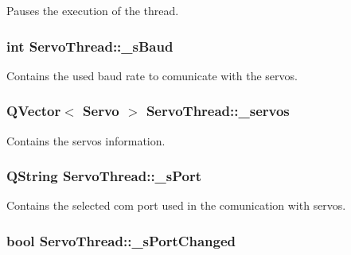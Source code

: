 Pauses the execution of the thread. 

\hypertarget{class_servo_thread_a5b9a41b9e271275b914affb0a845a2ee}{}
\subsubsection[{\+\_\+s\+Baud}]{\setlength{\rightskip}{0pt plus 5cm}int Servo\+Thread\+::\+\_\+s\+Baud\hspace{0.3cm}{\ttfamily [private]}}\label{class_servo_thread_a5b9a41b9e271275b914affb0a845a2ee}


Contains the used baud rate to comunicate with the servos. 

\hypertarget{class_servo_thread_a1ac6662fe6d198b5971ae0ffa7ddfcfd}{}
\subsubsection[{\+\_\+servos}]{\setlength{\rightskip}{0pt plus 5cm}Q\+Vector$<$ {\bf Servo} $>$ Servo\+Thread\+::\+\_\+servos\hspace{0.3cm}{\ttfamily [private]}}\label{class_servo_thread_a1ac6662fe6d198b5971ae0ffa7ddfcfd}


Contains the servos information. 

\hypertarget{class_servo_thread_ac9a614aa1518efb49b0a06636bd1bdbf}{}
\subsubsection[{\+\_\+s\+Port}]{\setlength{\rightskip}{0pt plus 5cm}Q\+String Servo\+Thread\+::\+\_\+s\+Port\hspace{0.3cm}{\ttfamily [private]}}\label{class_servo_thread_ac9a614aa1518efb49b0a06636bd1bdbf}


Contains the selected com port used in the comunication with servos. 

\hypertarget{class_servo_thread_a6e803432db01b10ed975132315280fd3}{}
\subsubsection[{\+\_\+s\+Port\+Changed}]{\setlength{\rightskip}{0pt plus 5cm}bool Servo\+Thread\+::\+\_\+s\+Port\+Changed\hspace{0.3cm}{\ttfamily [private]}}\label{class_servo_thread_a6e803432db01b10ed975132315280fd3}


